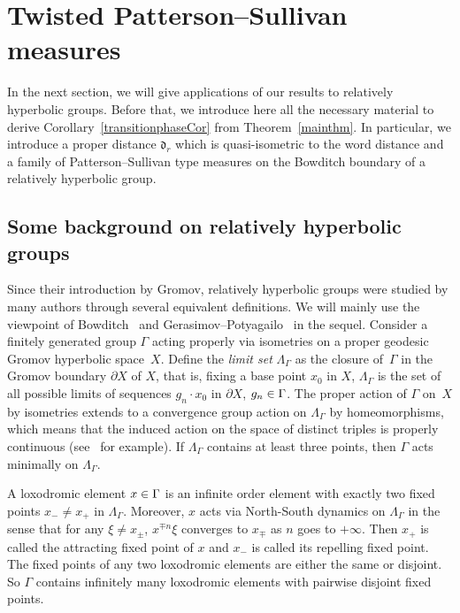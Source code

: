 \documentclass[10pt]{amsart}
\theoremstyle{definition}\newtheorem{defi}[theo]{Definition}\newtheorem{rema}[theo]{Remark}\newtheorem{exam}[theo]{Example}\newtheorem{exem}[theo]{Example}\newtheorem{nota}[theo]{Notation}
\newcommand{\fkd}{\mathfrak{d}}
\let\oldin\in
\renewcommand{\in}{\mathchoice{\oldin}{\oldin}{\,\oldin\,}{\,\oldin\,}}
\begin{document}
\section{Twisted Patterson--Sullivan measures}
\label{Sectionpattersonsullivan}

In the next section, we will give applications of our results to relatively hyperbolic groups. Before that, we introduce here all the necessary material to derive Corollary~\ref{transitionphaseCor} from Theorem~\ref{mainthm}. In particular, we introduce a proper distance $\fkd_r$ which is quasi-isometric to the word distance and a family of Patterson--Sullivan type measures on the Bowditch boundary of a relatively hyperbolic group.


\subsection{Some background on relatively hyperbolic groups}
\label{subsectiondefRHG}

Since their introduction by Gromov, relatively hyperbolic groups were studied by many authors through several equivalent definitions. We will mainly use the viewpoint of Bowditch~\cite{Bowditch} and Gerasimov--Potyagailo~\cite{GePoJEMS,GePoGGD,GP16} in the sequel. Consider a finitely generated group $\Gamma$ acting properly via isometries on a proper geodesic Gromov hyperbolic space~$X$. Define the \emph{limit set} $\Lambda_\Gamma$ as the closure of~$\Gamma$ in the Gromov boundary $\partial X$ of $X$, that is, fixing a base point $x_0$ in $X$, $\Lambda_\Gamma$ is the set of all possible limits of sequences $g_n\cdot x_0$ in $\partial X$, $g_n\in \Gamma$. The proper action of $\Gamma$ on~$X$ by isometries extends to a convergence group action on $\Lambda_\Gamma$ by homeomorphisms, which means that the induced action on the space of distinct triples is properly continuous (see~\cite[Proposition~1.11]{Bo99} for example). If $\Lambda_\Gamma$ contains at least three points, then $\Gamma$ acts minimally on $\Lambda_\Gamma$.

A loxodromic element $x\in \Gamma$ is an infinite order element with exactly two fixed points $x_-\ne x_+$ in $\Lambda_\Gamma$. Moreover, $x$ acts via North-South dynamics on $\Lambda_\Gamma$ in the sense that for any $\xi\neq x_{\pm}$, $x^{\mp n}\xi$ converges to $x_{\mp}$ as $n$ goes to $+\infty$. Then $x_+$ is called the attracting fixed point of $x$ and $x_-$ is called its repelling fixed point. The fixed points of any two loxodromic elements are either the same or disjoint. So $\Gamma$ contains infinitely many loxodromic elements with pairwise disjoint fixed points.
\end{document}
